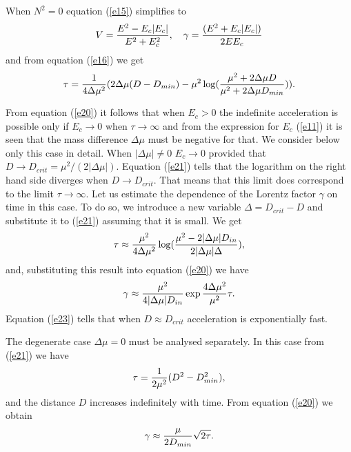 \documentclass[aip,nofootinbib]{revtex4}
\begin{document}
When $N^{2}=0$ equation (\ref{e15}) simplifies to
\begin{equation}
V={E^{2}-E_c|E_c|\over E^2+E_c^2}, \quad \gamma =
{(E^2+E_c|E_c|)\over 2EE_c} \label{e20}
\end{equation}
and from equation (\ref{e16}) we get
\begin{equation}
\tau={1\over 4\Delta \mu^2}(2\Delta \mu (D-D_{min})-\mu^{2}\log
({\mu^2 + 2\Delta \mu D\over \mu^2 +2\Delta \mu D_{min}})).
\label{e21}
\end{equation}

From equation (\ref{e20}) it follows that when $E_c > 0$ the
indefinite acceleration is possible only if $E_c \rightarrow 0$
when $\tau \rightarrow \infty$ and from the expression for $E_c$
(\ref{e11}) it is seen that the mass difference $\Delta \mu $ must
be negative for that. We consider below only this case in detail.
When $|\Delta \mu |\ne 0$ $E_c\rightarrow 0$ provided that
$D\rightarrow D_{crit}=\mu^2/(2|\Delta \mu |)$. Equation
(\ref{e21}) tells that the logarithm on the right hand side
diverges when $D\rightarrow D_{crit}$. That means that this limit
does correspond to the limit $\tau \rightarrow \infty$. Let us
estimate the dependence of the Lorentz factor $\gamma $ on time in
this case. To do so, we introduce a new variable $\Delta
=D_{crit}-D$ and substitute it to (\ref{e21}) assuming that it is
small. We get
\begin{equation}
\tau\approx {\mu^{2}\over 4\Delta \mu^2}\log ({\mu^{2}-2|\Delta
\mu |D_{in}\over 2|\Delta \mu |\Delta }),   \label{e22}
\end{equation}
and, substituting this result into equation (\ref{e20}) we have
\begin{equation}
\gamma \approx {\mu^2\over 4|\Delta \mu |D_{in}}\exp {4\Delta
\mu^2\over \mu^2}\tau.
 \label{e23}
\end{equation}
Equation (\ref{e23}) tells that when $D\approx D_{crit}$
acceleration is exponentially fast.

The degenerate case $\Delta \mu =0 $ must be analysed separately.
In this case from (\ref{e21}) we have
\begin{equation}
\tau={1\over 2\mu^2}(D^{2}-D_{min}^{2}), \label{e24}
\end{equation}
and the distance $D$ increases indefinitely with time. From
equation (\ref{e20}) we obtain
\begin{equation}
\gamma \approx {\mu \over 2D_{min}}\sqrt {2\tau }. \label{e25}
\end{equation}
\end{document}
